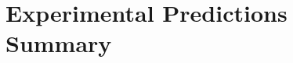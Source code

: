 \documentclass[12pt, twoside, openright]{book}
\theoremstyle{definition}
\theoremstyle{remark}
\begin{document}
\chapter{Experimental Predictions Summary}
\label{app:predictions}




\end{document}
